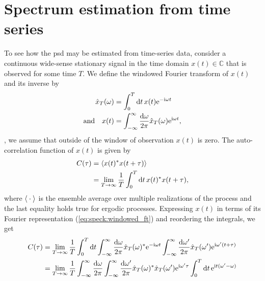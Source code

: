 \section{Spectrum estimation from time series}\label{sec:speck:theory:time_series_estimation}
To see how the \gls{psd} may be estimated from time-series data, consider a continuous wide-sense stationary
signal in the time domain $x(t)\in\mathbb{C}$ that is observed for some time $T$.
We define the windowed Fourier transform of $x(t)$ and its inverse by
\begin{align}
    \hat{x}_T(\omega) &= \int_{0}^{T}\dd{t} x(t)\e^{-\i\omega t} \label{eq:speck:windowed_ft}\\
       \qq*{and} x(t) &= \intinf\ddf{\omega}\hat{x}_T(\omega)\e^{\i\omega t}, \label{eq:speck:windowed_ft:inverse}
\end{align}
\ie, we assume that outside of the window of observation $x(t)$ is zero.
The auto-correlation function of $x(t)$ is given by
\begin{align}
    C(\tau) &= \expval{x(t)\conjugate x(t + \tau)} \label{eq:speck:autocorrelation}\\
            &= \lim_{T\to\infty} \frac{1}{T}\int_0^T\dd{t} x(t)\conjugate x(t + \tau),
\end{align}
where $\expval{\:\cdot\:}$ is the ensemble average over multiple realizations of the process and the last equality holds true for ergodic processes.
Expressing $x(t)$ in terms of its Fourier representation (\cref{eq:speck:windowed_ft}) and reordering the integrals, we get
\begin{align}
    C(\tau) &= \lim_{T\to\infty}\frac{1}{T}\int_0^T\dd{t}
                \int_{-\infty}^{\infty}\frac{\dd{\omega}}{2\pi}\hat{x}_T(\omega)^\ast\mathrm{e}^{-\mathrm{i}\omega t}
                \int_{-\infty}^{\infty}\frac{\dd{\omega^\prime}}{2\pi}\hat{x}_T(\omega^\prime)\mathrm{e}^{\mathrm{i}\omega^\prime (t + \tau)}  \\
            &= \lim_{T\to\infty}\frac{1}{T}\int_{-\infty}^{\infty}\frac{\dd{\omega}}{2\pi}\int_{-\infty}^{\infty}\frac{\dd{\omega^\prime}}{2\pi}
                \hat{x}_T(\omega)^\ast\hat{x}_T(\omega^\prime)\mathrm{e}^{\mathrm{i}\omega^\prime\tau}
                \int_0^T\dd{t}\mathrm{e}^{\mathrm{i} t (\omega^\prime - \omega)} \label{eq:speck:autocorrelation:fourier}
\end{align}
